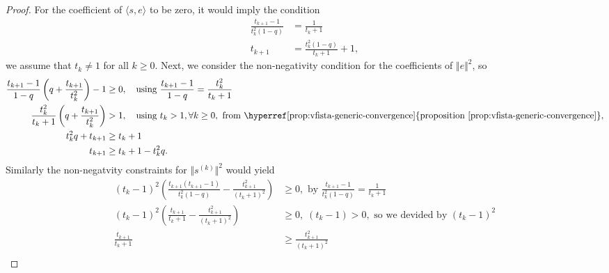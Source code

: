 \begin{proof}
        \par
        For the coefficient of $\langle s, e\rangle$ to be zero, it would imply the condition
        \begin{align}
            \frac{t_{k + 1} - 1}{t^2_k(1 - q)}    
            &= 
            \frac{1}{t_k + 1} \label{eqn:sequence-cond3}
            \\
            t_{k + 1} 
            &= \frac{t_k^2(1 - q)}{t_k + 1} + 1, 
        \end{align}
        we assume that $t_k \neq 1$ for all $k\ge 0$. 
        Next, we consider the non-negativity condition for the coefficients of $\Vert e\Vert^2$, so 
        \begin{align}
            \frac{t_{k + 1} - 1}{1 - q} 
            \left(
                q + \frac{t_{k + 1}}{t_k^2}
            \right)
            -1
            &\ge 0
            , \quad\text{using }
            \frac{t_{k + 1}-1}{1 - q}
            = \frac{t_k^2}{t_k + 1}
            \nonumber
            \\
            \frac{t_k^2}{t_k + 1}\left(
                q + \frac{t_{k + 1}}{t_k^2} 
            \right) 
            &> 1, \quad 
            \text{using } t_k > 1, \forall k\ge0, \text{ from \hyperref[prop:vfista-generic-convergence]{proposition \ref*{prop:vfista-generic-convergence}}}, 
            \nonumber
            \\
            t_k^2 q + t_{k + 1} &\ge t_k + 1
            \nonumber
            \\
            t_{k + 1} &\ge t_k + 1 - t_k^2 q. \label{eqn:seq-cond1}
        \end{align}
        Similarly the non-negatvity constraints for $\Vert s^{(k)}\Vert^2$ would yield 
        \begin{align*}
            (t_k - 1)^2 
            \left(
                \frac{t_{k + 1}(t_{k + 1} - 1)}{t_k^2(1 - q)}
                -
                \frac{t_{k + 1}^2}{(t_k + 1)^2}
            \right) & 
            \ge 0, \text{ by }
            \frac{t_{k + 1} - 1}{t_k^2(1 - q)}
            = 
            \frac{1}{t_k + 1}
            \\
            (t_k - 1)^2 \left(
                \frac{t_{k +1}}{t_k + 1} - 
                \frac{t_{k + 1}^2}{(t_k +1)^2} 
            \right)
            &\ge 0,  \; (t_k-1) > 0, \text{ so we devided by } (t_k - 1)^2
            \\
            \frac{t_{k + 1}}{t_k + 1} &\ge 
            \frac{t_{k + 1}^2}{(t_k + 1)^2}
            \\

\end{align*}
\end{proof}
